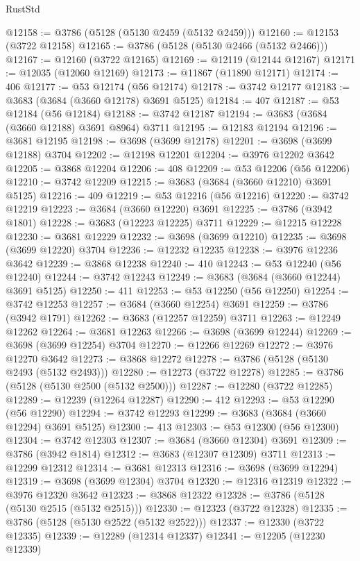 \begin{lexlean}{RustStd}
\begin{coremodule}
{\begin{coremodule}
{{{{{{{{{{{{{{{{{{{{{{{{{{{{{{{{{{{{{{{{{{{{{{{@12158 := @3786 (@5128 (@5130 @2459 (@5132 @2459)))
@12160 := @12153 (@3722 @12158)
@12165 := @3786 (@5128 (@5130 @2466 (@5132 @2466)))
@12167 := @12160 (@3722 @12165)
@12169 := @12119 (@12144 @12167)
@12171 := @12035 (@12060 @12169)
@12173 := @11867 (@11890 @12171)
@12174 := 406
@12177 := @53 @12174 (@56 @12174)
@12178 := @3742 @12177
@12183 := @3683 (@3684 (@3660 @12178) @3691 @5125)
@12184 := 407
@12187 := @53 @12184 (@56 @12184)
@12188 := @3742 @12187
@12194 := @3683 (@3684 (@3660 @12188) @3691 @8964) @3711
@12195 := @12183 @12194
@12196 := @3681 @12195
@12198 := @3698 (@3699 @12178)
@12201 := @3698 (@3699 @12188) @3704
@12202 := @12198 @12201
@12204 := @3976 @12202 @3642
@12205 := @3868 @12204
@12206 := 408
@12209 := @53 @12206 (@56 @12206)
@12210 := @3742 @12209
@12215 := @3683 (@3684 (@3660 @12210) @3691 @5125)
@12216 := 409
@12219 := @53 @12216 (@56 @12216)
@12220 := @3742 @12219
@12223 := @3684 (@3660 @12220) @3691
@12225 := @3786 (@3942 @1801)
@12228 := @3683 (@12223 @12225) @3711
@12229 := @12215 @12228
@12230 := @3681 @12229
@12232 := @3698 (@3699 @12210)
@12235 := @3698 (@3699 @12220) @3704
@12236 := @12232 @12235
@12238 := @3976 @12236 @3642
@12239 := @3868 @12238
@12240 := 410
@12243 := @53 @12240 (@56 @12240)
@12244 := @3742 @12243
@12249 := @3683 (@3684 (@3660 @12244) @3691 @5125)
@12250 := 411
@12253 := @53 @12250 (@56 @12250)
@12254 := @3742 @12253
@12257 := @3684 (@3660 @12254) @3691
@12259 := @3786 (@3942 @1791)
@12262 := @3683 (@12257 @12259) @3711
@12263 := @12249 @12262
@12264 := @3681 @12263
@12266 := @3698 (@3699 @12244)
@12269 := @3698 (@3699 @12254) @3704
@12270 := @12266 @12269
@12272 := @3976 @12270 @3642
@12273 := @3868 @12272
@12278 := @3786 (@5128 (@5130 @2493 (@5132 @2493)))
@12280 := @12273 (@3722 @12278)
@12285 := @3786 (@5128 (@5130 @2500 (@5132 @2500)))
@12287 := @12280 (@3722 @12285)
@12289 := @12239 (@12264 @12287)
@12290 := 412
@12293 := @53 @12290 (@56 @12290)
@12294 := @3742 @12293
@12299 := @3683 (@3684 (@3660 @12294) @3691 @5125)
@12300 := 413
@12303 := @53 @12300 (@56 @12300)
@12304 := @3742 @12303
@12307 := @3684 (@3660 @12304) @3691
@12309 := @3786 (@3942 @1814)
@12312 := @3683 (@12307 @12309) @3711
@12313 := @12299 @12312
@12314 := @3681 @12313
@12316 := @3698 (@3699 @12294)
@12319 := @3698 (@3699 @12304) @3704
@12320 := @12316 @12319
@12322 := @3976 @12320 @3642
@12323 := @3868 @12322
@12328 := @3786 (@5128 (@5130 @2515 (@5132 @2515)))
@12330 := @12323 (@3722 @12328)
@12335 := @3786 (@5128 (@5130 @2522 (@5132 @2522)))
@12337 := @12330 (@3722 @12335)
@12339 := @12289 (@12314 @12337)
@12341 := @12205 (@12230 @12339)
}}}}}}}}}}}}}}}}}}}}}}}}}}}}}}}}}}}}}}}}}}}}}}}
\end{coremodule}}
\end{coremodule}
\end{lexlean}
